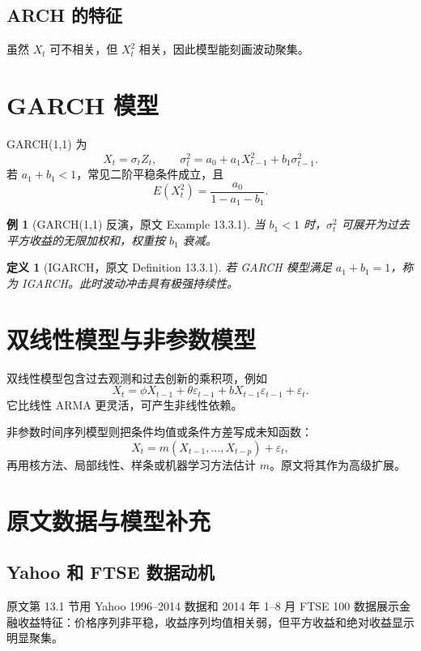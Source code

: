 \documentclass[11pt,a4paper]{ctexart}
\newtheorem{definition}{定义}[section]
\newtheorem{example}{例}[section]
\begin{document}
\subsection{ARCH 的特征}

虽然 \(X_t\) 可不相关，但 \(X_t^2\) 相关，因此模型能刻画波动聚集。

\section{GARCH 模型}

GARCH(1,1) 为
\[
  X_t=\sigma_tZ_t,\qquad
  \sigma_t^2=a_0+a_1X_{t-1}^2+b_1\sigma_{t-1}^2.
\]
若 \(a_1+b_1<1\)，常见二阶平稳条件成立，且
\[
  E(X_t^2)=\frac{a_0}{1-a_1-b_1}.
\]

\begin{example}[GARCH(1,1) 反演，原文 Example 13.3.1]
当 \(b_1<1\) 时，\(\sigma_t^2\) 可展开为过去平方收益的无限加权和，权重按 \(b_1\) 衰减。
\end{example}

\begin{definition}[IGARCH，原文 Definition 13.3.1]
若 GARCH 模型满足 \(a_1+b_1=1\)，称为 IGARCH。此时波动冲击具有极强持续性。
\end{definition}

\section{双线性模型与非参数模型}

双线性模型包含过去观测和过去创新的乘积项，例如
\[
  X_t=\phi X_{t-1}+\theta\varepsilon_{t-1}
      +bX_{t-1}\varepsilon_{t-1}+\varepsilon_t.
\]
它比线性 ARMA 更灵活，可产生非线性依赖。

非参数时间序列模型则把条件均值或条件方差写成未知函数：
\[
  X_t=m(X_{t-1},\ldots,X_{t-p})+\varepsilon_t,
\]
再用核方法、局部线性、样条或机器学习方法估计 \(m\)。原文将其作为高级扩展。

\section{原文数据与模型补充}

\subsection{Yahoo 和 FTSE 数据动机}
原文第 13.1 节用 Yahoo 1996--2014 数据和 2014 年 1--8 月 FTSE 100 数据展示金融收益特征：价格序列非平稳，收益序列均值相关弱，但平方收益和绝对收益显示明显聚集。
\end{document}

